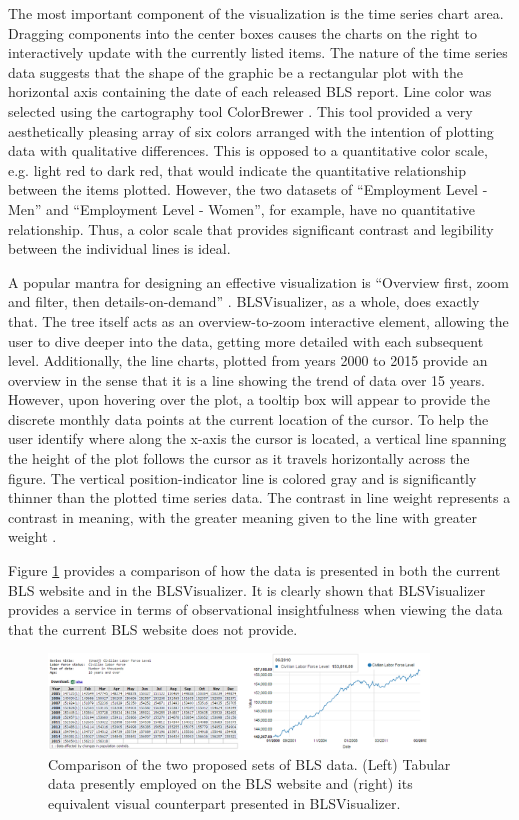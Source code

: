 \documentclass[11pt,letterpaper]{article}
\begin{document}
The most important component of the visualization is the time series chart area. Dragging components into the center boxes causes the charts on the right to interactively update with the currently listed items. The nature of the time series data suggests that the shape of the graphic be a rectangular plot with the horizontal axis containing the date of each released BLS report. Line color was selected using the cartography tool ColorBrewer \cite{harrower2003colorbrewer}. This tool provided a very aesthetically pleasing array of six colors arranged with the intention of plotting data with qualitative differences. This is opposed to a quantitative color scale, e.g. light red to dark red, that would indicate the quantitative relationship between the items plotted. However, the two datasets of ``Employment Level - Men'' and ``Employment Level - Women'', for example, have no quantitative relationship. Thus, a color scale that provides significant contrast and legibility between the individual lines is ideal.

A popular mantra for designing an effective visualization is ``Overview first, zoom and filter, then details-on-demand'' \cite{shneiderman_eyes_1996}. BLSVisualizer, as a whole, does exactly that. The tree itself acts as an overview-to-zoom interactive element, allowing the user to dive deeper into the data, getting more detailed with each subsequent level. Additionally, the line charts, plotted from years 2000 to 2015 provide an overview in the sense that it is a line showing the trend of data over 15 years. However, upon hovering over the plot, a tooltip box will appear to provide the discrete monthly data points at the current location of the cursor. To help the user identify where along the x-axis the cursor is located, a vertical line spanning the height of the plot follows the cursor as it travels horizontally across the figure. The vertical position-indicator line is colored gray and is significantly thinner than the plotted time series data. The contrast in line weight represents a contrast in meaning, with the greater meaning given to the line with greater weight \cite{tufte1983visual}.

Figure \ref{TablePlot} provides a comparison of how the data is presented in both the current BLS website and in the BLSVisualizer. It is clearly shown that BLSVisualizer provides a service in terms of observational insightfulness when viewing the data that the current BLS website does not provide.

\begin{figure}[h]
\centering
    \includegraphics[width=0.9\textwidth]{figures/PlotTable.png}
    \caption{Comparison of the two proposed sets of BLS data. (Left) Tabular data presently employed on the BLS website and (right) its equivalent visual counterpart presented in BLSVisualizer.}
    \label{TablePlot}
\end{figure}
\end{document}
